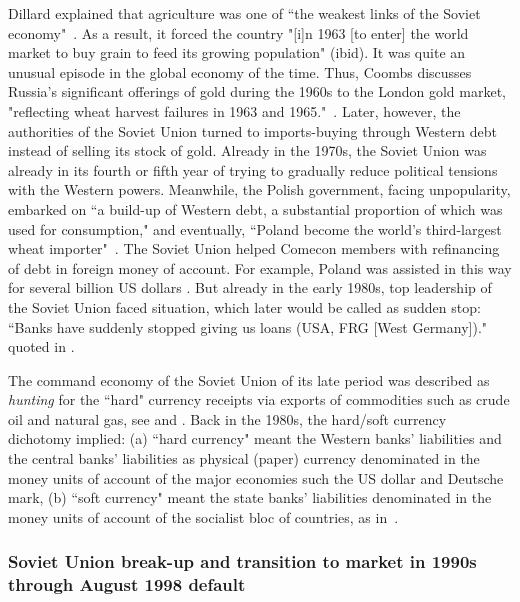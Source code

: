 Dillard explained that agriculture was one of ``the weakest links of the
Soviet economy"~\citep[p.~628]{dillard2}. As a result, it forced the country
"[i]n 1963 [to enter] the world market to buy grain to feed its growing
population" (ibid). It was quite an unusual episode in the global
economy of the time. Thus, Coombs discusses Russia's significant
offerings of gold during the 1960s to the London gold market,
"reflecting wheat harvest failures in 1963 and 1965."~\citep[p.~154]{coombs1976}.
Later, however, the authorities of the Soviet Union turned to
imports-buying through Western debt instead of selling its stock of
gold. Already in the 1970s, the Soviet Union was already in its fourth
or fifth year of trying to gradually reduce political tensions with the
Western powers. Meanwhile, the Polish government, facing unpopularity,
embarked on ``a build-up of Western debt, a substantial proportion of
which was used for consumption," and eventually, ``Poland become the
world's third-largest wheat importer"~\citep[pp.~89-90]{harold}. The Soviet
Union helped Comecon members with refinancing of debt in foreign money
of account. For example, Poland was assisted in this way for several
billion US dollars \citep{stasi1981}. But already in the early 1980s, top
leadership of the Soviet Union faced situation, which later would be
called as sudden stop: ``Banks have suddenly stopped giving us loans
(USA, FRG [West Germany])." \citep{stasi1981} quoted in \citep[pp.~15-16]{zubok2021}.

The command economy of the Soviet Union of its late period was described
as \textit{hunting} for the ``hard" currency receipts via exports of commodities
such as crude oil and natural gas, see \citep[p.~222]{dibb1988} and \citep{zubok2021}. Back
in the 1980s, the hard/soft currency dichotomy implied: (a) ``hard
currency" meant the Western banks' liabilities and the central banks'
liabilities as physical (paper) currency denominated in the money units
of account of the major economies such the US dollar and Deutsche mark,
(b) ``soft currency" meant the state banks' liabilities denominated in
the money units of account of the socialist bloc of countries, as in~\citep{dibb1988}.


\subsubsection{Soviet Union break-up and transition to market in 1990s through August 1998 default}

